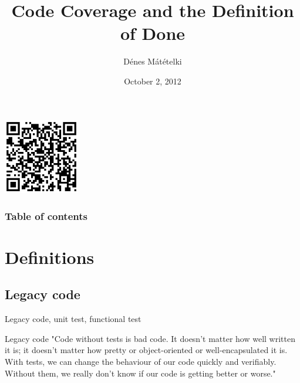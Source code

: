 \documentclass{beamer}
\title {Code Coverage and the Definition of Done}
\author{Dénes Mátételki}
\institute{www.emerson.com}
\date{October 2, 2012}
\begin{document}

\begin{frame}
\begin{titlepage}
\begin{center}
\includegraphics[height=3.3cm]{qr_cc_and_dod.png}
\end{center}
\end{titlepage}

\end{frame}


\begin{frame}
\frametitle{Table of contents}
\tableofcontents
\end{frame}


\section{Definitions}

\subsection{Legacy code}


\begin{frame}{Legacy code, unit test, functional test}



\begin{block}{Legacy code}
"Code without tests is bad code. It doesn't matter how well written it is; it doesn't matter how pretty or object-oriented or well-encapsulated it is. With tests, we can change the behaviour of our code quickly and verifiably. Without them, we really don't know if our code is getting better or worse." \cite{legacy}
\end{block}

\end{frame}
\end{document}
